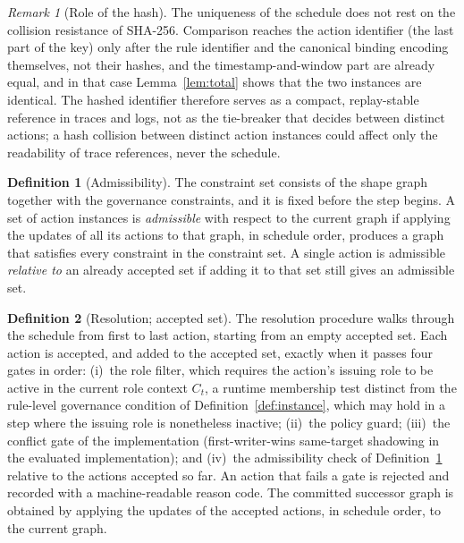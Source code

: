 \documentclass{ieeeaccess}
\theoremstyle{definition}
\newtheorem{definition}{Definition}
\theoremstyle{plain}
\theoremstyle{remark}
\newtheorem{remark}{Remark}
\begin{document}
\begin{remark}[Role of the hash]
\label{rem:hash}
The uniqueness of the schedule does not rest on the collision resistance of SHA-256. Comparison reaches the action identifier (the last part of the key) only after the rule identifier and the canonical binding encoding themselves, not their hashes, and the timestamp-and-window part are already equal, and in that case Lemma~\ref{lem:total} shows that the two instances are identical. The hashed identifier therefore serves as a compact, replay-stable reference in traces and logs, not as the tie-breaker that decides between distinct actions; a hash collision between distinct action instances could affect only the readability of trace references, never the schedule.
\end{remark}

\begin{definition}[Admissibility]
\label{def:admissibility}
The constraint set consists of the shape graph together with the governance constraints, and it is fixed before the step begins. A set of action instances is \emph{admissible} with respect to the current graph if applying the updates of all its actions to that graph, in schedule order, produces a graph that satisfies every constraint in the constraint set. A single action is admissible \emph{relative to} an already accepted set if adding it to that set still gives an admissible set.
\end{definition}

\begin{definition}[Resolution; accepted set]
\label{def:resolution}
The resolution procedure walks through the schedule from first to last action, starting from an empty accepted set. Each action is accepted, and added to the accepted set, exactly when it passes four gates in order: (i)~the role filter, which requires the action's issuing role to be active in the current role context $C_t$, a runtime membership test distinct from the rule-level governance condition of Definition~\ref{def:instance}, which may hold in a step where the issuing role is nonetheless inactive; (ii)~the policy guard; (iii)~the conflict gate of the implementation (first-writer-wins same-target shadowing in the evaluated implementation); and (iv)~the admissibility check of Definition~\ref{def:admissibility} relative to the actions accepted so far. An action that fails a gate is rejected and recorded with a machine-readable reason code. The committed successor graph is obtained by applying the updates of the accepted actions, in schedule order, to the current graph.
\end{definition}
\end{document}
